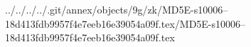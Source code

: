 ../../../../.git/annex/objects/9g/zk/MD5E-s10006--18d413fdb9957f4e7eeb16e39054a09f.tex/MD5E-s10006--18d413fdb9957f4e7eeb16e39054a09f.tex